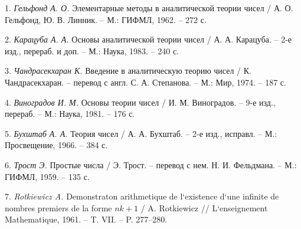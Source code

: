 \litlist

1. {\it Гельфонд А. О.} Элементарные методы в аналитической теории чисел / А. О. Гельфонд, Ю. В. Линник. -- М.: ГИФМЛ, 1962. -- 272 с.

2. {\it Карацуба А. А.} Основы аналитической теории чисел / А. А. Карацуба. -- 2-е изд., перераб. и доп. -- М.: Наука, 1983. -- 240 с.

3. {\it Чандрасекхаран К.} Введение в аналитическую теорию чисел / К. Чандрасекхаран. -- перевод с англ. С. А. Степанова. -- М.: Мир, 1974. -- 187 с.

4. {\it Виноградов И. М.} Основы теории чисел / И. М. Виноградов. -- 9-е изд., перераб. -- М.: Наука, 1981. -- 176 с.

5. {\it Бухштаб А. А.} Теория чисел / А. А. Бухштаб. -- 2-е изд., исправл. -- М.: Просвещение, 1966. -- 384 с.

6. {\it Трост Э.} Простые числа / Э. Трост. -- перевод с нем. Н. И. Фельдмана. -- М.: ГИФМЛ, 1959. -- 135 с.

7. {\it Rotkiewicz A.} Demonstraton arithmetique de l`existence d`une infinite de nombres premiers de la forme $nk+ 1$ / A. Rotkiewicz // L`enseignement Mathematique, 1961. -- T. VII. -- P. 277--280.
